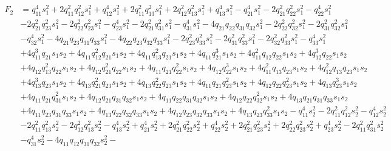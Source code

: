 \documentclass[10pt]{amsart}
\theoremstyle{definition}
\theoremstyle{corollary}
\theoremstyle{remark}
\theoremstyle{conclusion}
\begin{document}
{\small \begin{equation}
\begin{split}
F_2&=q_{11}^4 s_{1}^2 + 2 q_{11}^2 q_{12}^2 s_{1}^2 + q_{12}^4 s_{1}^2 + 2 q_{11}^2 q_{13}^2 s_{1}^2 + 
2 q_{12}^2 q_{13}^2 s_{1}^2 + q_{13}^4 s_{1}^2 - q_{21}^4 s_{1}^2 - 2 q_{21}^2 q_{22}^2 s_{1}^2 
- q_{22}^4 s_{1}^2 \\
&- 2 q_{21}^2 q_{23}^2 s_{1}^2 - 2 q_{22}^2 q_{23}^2 s_{1}^2 - q_{23}^4 s_{1}^2 - 
2 q_{21}^2 q_{31}^2 s_{1}^2 - q_{31}^4 s_{1}^2 - 4 q_{21} q_{22} q_{31} q_{32} s_{1}^2 - 
2 q_{22}^2 q_{32}^2 s_{1}^2 - 2 q_{31}^2 q_{32}^2 s_{1}^2 \\
&- q_{32}^4 s_{1}^2 - 4 q_{21} q_{23} q_{31} q_{33} s_{1}^2 - 4 q_{22} q_{23} q_{32} q_{33} s_{1}^2 - 
2 q_{23}^2 q_{33}^2 s_{1}^2 - 2 q_{31}^2 q_{33}^2 s_{1}^2 - 2 q_{32}^2 q_{33}^2 s_{1}^2 - 
q_{33}^4 s_{1}^2 \\
&+ 4 q_{11}^3 q_{21} s_{1} s_{2} + 4 q_{11} q_{12}^2 q_{21} s_{1} s_{2} + 
4 q_{11} q_{13}^2 q_{21} s_{1} s_{2} + 4 q_{11} q_{21}^3 s_{1} s_{2} + 4 q_{11}^2 q_{12} q_{22} s_{1} s_{2} + 
4 q_{12}^3 q_{22} s_{1} s_{2} \\
&+ 4 q_{12} q_{13}^2 q_{22} s_{1} s_{2} + 4 q_{12} q_{21}^2 q_{22} s_{1} s_{2} + 
4 q_{11} q_{21} q_{22}^2 s_{1} s_{2} + 4 q_{12} q_{22}^3 s_{1} s_{2} + 4 q_{11}^2 q_{13} q_{23} s_{1} s_{2} + 
4 q_{12}^2 q_{13} q_{23} s_{1} s_{2} \\
&+ 4 q_{13}^3 q_{23} s_{1} s_{2} + 4 q_{13} q_{21}^2 q_{23} s_{1} s_{2} + 
4 q_{13} q_{22}^2 q_{23} s_{1} s_{2} + 4 q_{11} q_{21} q_{23}^2 s_{1} s_{2} + 
4 q_{12} q_{22} q_{23}^2 s_{1} s_{2} + 4 q_{13} q_{23}^3 s_{1} s_{2} \\
&+ 4 q_{11} q_{21} q_{31}^2 s_{1} s_{2} + 
4 q_{12} q_{21} q_{31} q_{32} s_{1} s_{2} + 4 q_{11} q_{22} q_{31} q_{32} s_{1} s_{2} + 
4 q_{12} q_{22} q_{32}^2 s_{1} s_{2} + 4 q_{13} q_{21} q_{31} q_{33} s_{1} s_{2} \\
&+ 
4 q_{11} q_{23} q_{31} q_{33} s_{1} s_{2} + 4 q_{13} q_{22} q_{32} q_{33} s_{1} s_{2} + 
4 q_{12} q_{23} q_{32} q_{33} s_{1} s_{2} + 4 q_{13} q_{23} q_{33}^2 s_{1} s_{2} - q_{11}^4 s_{2}^2 - 
2 q_{11}^2 q_{12}^2 s_{2}^2 - q_{12}^4 s_{2}^2\\ 
&- 2 q_{11}^2 q_{13}^2 s_{2}^2
- 2 q_{12}^2 q_{13}^2 s_{2}^2 - q_{13}^4 s_{2}^2 + q_{21}^4 s_{2}^2 + 2 q_{21}^2 q_{22}^2 s_{2}^2 + 
q_{22}^4 s_{2}^2 + 2 q_{21}^2 q_{23}^2 s_{2}^2 + 2 q_{22}^2 q_{23}^2 s_{2}^2 + q_{23}^4 s_{2}^2 - 
2 q_{11}^2 q_{31}^2 s_{2}^2\\
& - q_{31}^4 s_{2}^2 - 4 q_{11} q_{12} q_{31} q_{32} s_{2}^2 - 

\end{split}
\end{equation}}
\end{document}
